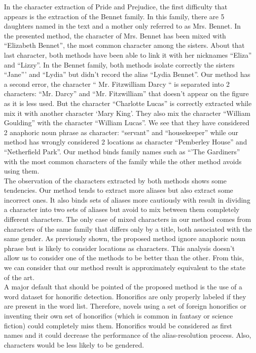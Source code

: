 \documentclass[a4paper, 12pt]{report}
\begin{document}
In the character extraction of Pride and Prejudice, the first difficulty that appears is the extraction of the Bennet family.
In this family, there are 5 daughters named in the text and a mother only referred to as Mrs. Bennet.
In the presented method, the character of Mrs. Bennet has been mixed with ``Elizabeth Bennet'', the most common character among the sisters. About that last character,
both methods have been able to link it with her nicknames ``Eliza'' and ``Lizzy''. In the Bennet family, both methods isolate correctly the sisters ``Jane''' and ``Lydia''
but \cite{character_meta} didn't record the alias ``Lydia Bennet''.
Our method has a second error, the character `` Mr. Fitzwilliam Darcy `` is separated into 2 characters: ``Mr. Darcy'' and ``Mr. Fitzwilliam'' that doesn't appear on the figure
as it is less used. But the character ``Charlotte Lucas'' is correctly extracted while \cite{character_meta} mix it with another character `Mary King'.
They also mix the character ``William Goulding'' with the character ``William Lucas''.
We see that they have considered 2 anaphoric noun phrase as character: ``servant'' and ``housekeeper''
while our method has wrongly considered 2 locations as character ``Pemberley House'' and ``Netherfield Park''.
Our method binds family names such as ``'The Gardiners'' with the most common characters of the family while the other method avoids using them.\\

The observation of the characters extracted by both methods shows some tendencies. Our method tends to extract more aliases but also extract some incorrect ones.
It also binds sets of aliases more cautiously with result in dividing a character into two sets of aliases but avoid to mix between them completely different characters.
The only case of mixed characters in our method comes from characters of the same family that differs only by a title, both associated with the same gender.
As previously shown, the proposed method ignore anaphoric noun phrase but is likely to consider locations as characters.
This analysis doesn't allow us to consider one of the methods to be better than the other.
From this, we can consider that our method result is approximately equivalent to the state of the art. \\

A major default that should be pointed of the proposed method is the use of a word dataset for honorific detection.
Honorifics are only properly labeled if they are present in the word list. Therefore, novels using a set of foreign honorifics or inventing their own set of honorifics
(which is common in fantasy or science fiction) could completely miss them.
Honorifics would be considered as first names and it could decrease the performance of the alias-resolution process.
Also, characters would be less likely to be gendered. \\
\end{document}
